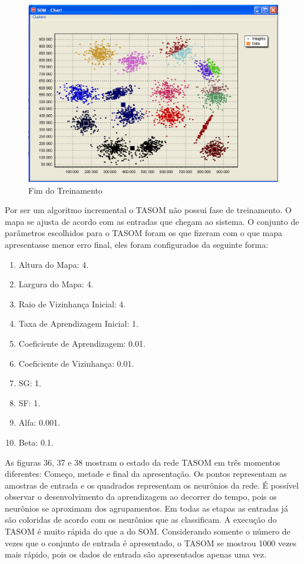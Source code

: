\begin{figure}[!h]
\centering
\includegraphics[keepaspectratio=true,scale=0.5]
{figuras/som3.eps}
\caption{Fim do Treinamento}
\label{data_titatic}
\end{figure} 

Por ser um algoritmo incremental o TASOM não possui fase de treinamento. O mapa se ajusta de acordo com as entradas que chegam ao sistema. O conjunto de parâmetros escolhidos para o TASOM foram os que fizeram com o que mapa apresentasse menor erro final, eles foram configurados da seguinte forma: 

\begin{enumerate}
\item Altura do Mapa: 4.
\item Largura do Mapa: 4.
\item Raio de Vizinhança Inicial: 4.
\item Taxa de Aprendizagem Inicial: 1.
\item Coeficiente de Aprendizagem: 0.01.
\item Coeficiente de Vizinhança: 0.01.
\item SG: 1.
\item SF: 1.
\item Alfa: 0.001.
\item Beta: 0.1.
\end{enumerate}


As figuras 36, 37 e 38 mostram o estado da rede TASOM em três momentos diferentes: Começo, metade e final da apresentação. Os pontos representam as amostras de entrada e os quadrados representam os neurônios da rede. É possível observar o desenvolvimento da aprendizagem ao decorrer do tempo, pois os neurônios se aproximam dos agrupamentos. Em todas as etapas as entradas já são coloridas de acordo com os neurônios que as classificam. A execução do TASOM é muito rápida do que a do SOM. Considerando somente o número de vezes que o conjunto de entrada é apresentado, o TASOM se mostrou 1000 vezes mais rápido, pois os dados de entrada são apresentados apenas uma vez.


